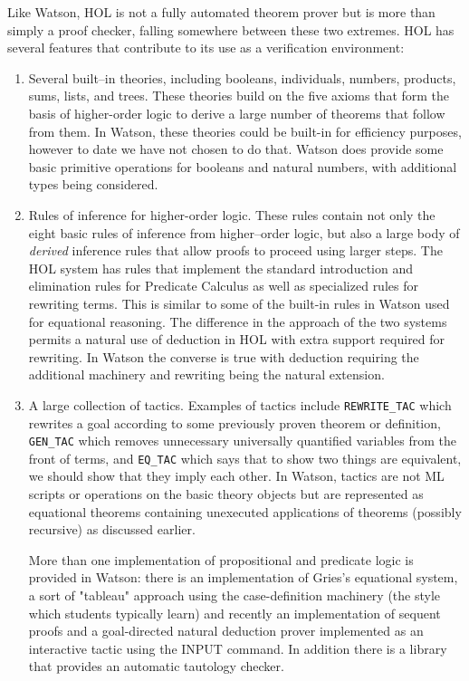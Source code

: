 \documentclass{kluwer}
\newcommand{\ml}[1]{\mbox{\small\tt #1}}
\begin{document}
\begin{article}
Like Watson, HOL is not a fully automated theorem prover but is more than 
simply a proof
checker, falling somewhere between these two extremes. HOL has several
features that contribute to its use as a verification environment:
\begin{enumerate}
\item
Several built--in theories, including booleans, individuals, numbers,
products, sums, lists, and trees. These theories build on the five
axioms that form the basis of higher-order logic to derive a large
number of theorems that follow from them. In Watson, these theories
could be built-in for efficiency purposes, however to date we have not
chosen to do that.  Watson does provide some basic primitive
operations for booleans and natural numbers, with additional types
being considered.
\item
Rules of inference for higher-order logic. These rules contain not
only the eight basic rules of inference from higher--order logic, but
also a large body of {\em derived} inference rules that allow proofs
to proceed using larger steps. The HOL system has rules that implement
the standard introduction and elimination rules for Predicate Calculus
as well as specialized rules for rewriting terms. This is similar to
some of the built-in rules in Watson used for equational
reasoning. The difference in the approach of the two systems permits a
natural use of deduction in HOL with extra support required for
rewriting. In Watson the converse is true with deduction requiring the
additional machinery and rewriting being the natural extension.
\item
A large collection of tactics. Examples of tactics include
\ml{REWRITE\_TAC} which rewrites a goal according to some previously
proven theorem or definition, \ml{GEN\_TAC} which removes unnecessary
universally quantified variables from the front of terms, and
\ml{EQ\_TAC} which says that to show two things are equivalent, we
should show that they imply each other.  In Watson, tactics are not ML
scripts or operations on the basic theory objects but are represented
as equational theorems containing unexecuted applications of theorems
(possibly recursive) as discussed earlier.

More than one implementation of propositional and predicate logic
is provided in Watson: there is an implementation of Gries's equational
system, a sort of "tableau" approach using the case-definition machinery
(the style which students typically learn) and recently an implementation
of sequent proofs and a goal-directed natural deduction prover implemented
as an interactive tactic using the INPUT command. In addition there is a library
that provides an automatic tautology checker. 


\end{enumerate}
\end{article}
\end{document}
